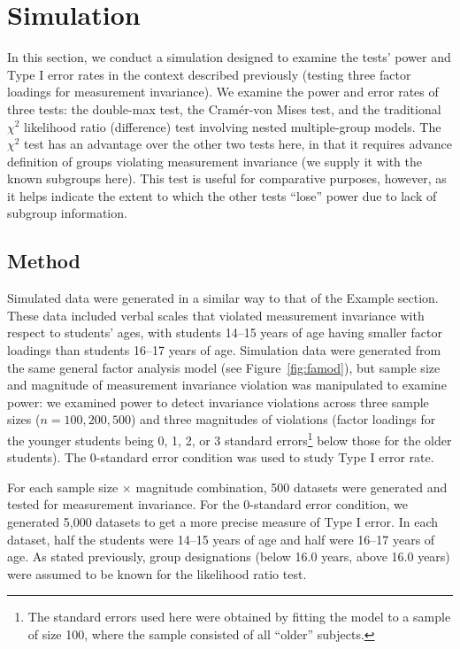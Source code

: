 \documentclass[man]{apa}
\begin{document}
\section{Simulation}
In this section, we conduct a simulation designed to
examine the tests' power and Type I error rates in the context
described previously (testing three factor loadings for measurement
invariance).  We 
examine the power and error rates of three tests: the double-max test, the
Cram\'{e}r-von Mises test, and the traditional $\chi^2$ likelihood
ratio (difference) test involving nested 
multiple-group models.  The $\chi^2$ test has an advantage over the
other two tests here, in that it requires advance definition of
groups violating measurement invariance (we supply it with the known
subgroups here).  This test is useful for comparative purposes,
however, as it helps indicate the extent to which the other tests
``lose'' power due to lack of subgroup information.

\subsection{Method}
Simulated data were generated in a similar way to that of 
the Example section.
These data included verbal scales that violated measurement invariance
with respect to students' ages, with students 14--15 years of age
having smaller factor loadings than students 16--17 years of age.  
Simulation data were generated from the same general factor analysis
model (see Figure~\ref{fig:famod}), but sample size and magnitude
of measurement 
invariance violation was manipulated to examine power:
we examined power to detect 
invariance violations across three sample sizes ($n=100,
200, 500$) and three magnitudes of violations (factor loadings
for the younger students being 0, 1, 2, or 3 standard
errors\footnote{The standard errors used here were
  obtained by fitting
  the model to a sample of size 100, where the sample consisted of all
  ``older'' subjects.} below 
those for the older students).  The 0-standard error condition was
used to study Type I error rate.

For each sample size $\times$
magnitude combination, 500 datasets were generated and tested for
measurement invariance.  For the 0-standard error condition, we
generated 5,000 datasets to get a more precise measure of Type I
error.  In each dataset, half the students were 14--15
years of age and half were 16--17 years of age.  As stated previously,
group
designations (below 16.0 years, above 16.0 years) were assumed to be
known for the likelihood ratio test.
\end{document}
